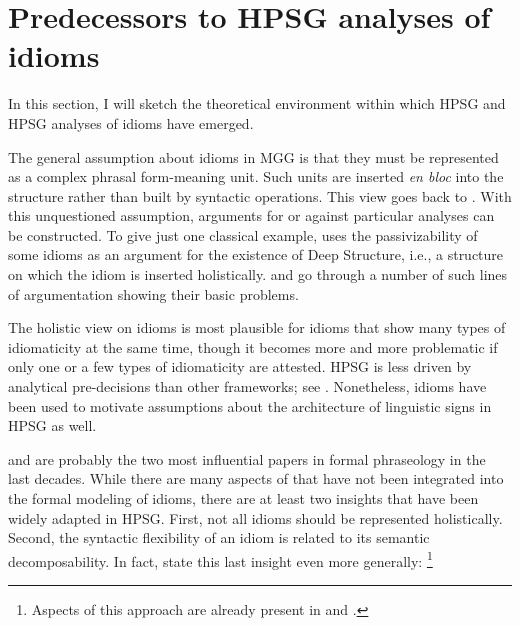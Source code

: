 \documentclass[output=paper
 	        ,biblatex
                ,babelshorthands
                ,newtxmath
                ,draftmode
                ,colorlinks, citecolor=brown
]{langscibook}
\begin{document}




\section{Predecessors to HPSG analyses of idioms}
\label{Sec-Predecessors}


In this section, I will sketch the theoretical environment within which HPSG and HPSG analyses of idioms have emerged.

The general assumption about idioms in MGG is that they
must be represented as a complex phrasal form-meaning unit. 
Such units are inserted \emph{en bloc} into the structure rather than built by syntactic operations.
This view goes back to \citet[]{Chomsky:65}. 
With this unquestioned assumption, arguments for or against particular analyses can be constructed. 
To give just one classical example, \citet[]{Chomsky81a} uses the passivizability of some idioms as an argument for the existence of Deep Structure, i.e., a structure on which the idiom is inserted holistically. 
%
\citet{Ruwet:91} and \citet{NSW94a} go through a number of such lines of argumentation showing their basic problems. 

The holistic view on idioms is most plausible for idioms that show many types of idiomaticity at the same time, though it becomes more and more problematic if only one or a few types of idiomaticity are attested.
HPSG is less driven by analytical pre-decisions than other frameworks; see
. Nonetheless, idioms have been used to motivate assumptions about the architecture of linguistic signs in HPSG as well.

\citet{WSN84a-u} and \citet{NSW94a} are probably the two most influential papers in formal phraseology in the last decades. 
While there are many aspects of \citet{NSW94a} that have not been integrated into the formal modeling of idioms, 
there are at least two insights that have been widely adapted in HPSG.
First, not all idioms should be represented holistically. 
Second, the syntactic flexibility of an idiom is related to its semantic decomposability. 
In fact, \citet{NSW94a} state this last insight even more generally:%
\footnote{Aspects of this approach are already present in \citet{Higgins:74} and \citet{Newmeyer:74}.}
\end{document}
